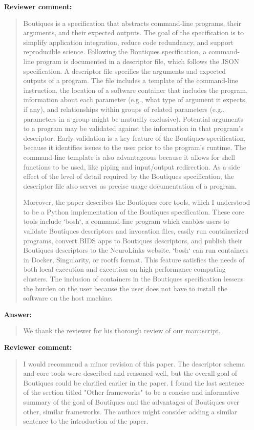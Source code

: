 \documentclass[a4]{article}
\newenvironment{review}%
{\textbf{Reviewer comment:}\begin{quote}}%
{\end{quote}}%
\newenvironment{answer}%
{\textbf{Answer:}\begin{small}\begin{quote}}%
{\end{quote}\end{small}}%
\begin{document}
\begin{review}
Boutiques is a specification that abstracts command-line programs,
their arguments, and their expected outputs. The goal of the
specification is to simplify application integration, reduce code
redundancy, and support reproducible science. Following the Boutiques
specification, a command-line program is documented in a descriptor
file, which follows the JSON specification. A descriptor file
specifies the arguments and expected outputs of a program. The file
includes a template of the command-line instruction, the location of a
software container that includes the program, information about each
parameter (e.g., what type of argument it expects, if any), and
relationships within groups of related parameters (e.g., parameters in
a group might be mutually exclusive). Potential arguments to a program
may be validated against the information in that program's
descriptor. Early validation is a key feature of the Boutiques
specification, because it identifies issues to the user prior to the
program's runtime. The command-line template is also advantageous
because it allows for shell functions to be used, like piping and
input/output redirection. As a side effect of the level of detail
required by the Boutiques specification, the descriptor file also
serves as precise usage documentation of a program.

Moreover, the paper describes the Boutiques core tools, which I
understood to be a Python implementation of the Boutiques
specification. These core tools include `bosh`, a command-line program
which enables users to validate Boutiques descriptors and invocation
files, easily run containerized programs, convert BIDS apps to
Boutiques descriptors, and publish their Boutiques descriptors to the
NeuroLinks website. `bosh` can run containers in Docker, Singularity,
or rootfs format. This feature satisfies the needs of both local
execution and execution on high performance computing clusters. The
inclusion of containers in the Boutiques specification lessens the
burden on the user because the user does not have to install the
software on the host machine.
\end{review}

\begin{answer}
  We thank the reviewer for his thorough review of our manuscript.
\end{answer}


\begin{review}
I would recommend a minor revision of this paper. The descriptor
schema and core tools were described and reasoned well, but the
overall goal of Boutiques could be clarified earlier in the paper. I
found the last sentence of the section titled "Other frameworks" to be
a concise and informative summary of the goal of Boutiques and the
advantages of Boutiques over other, similar frameworks. The authors
might consider adding a similar sentence to the introduction of the
paper.
\end{review}
\end{document}
